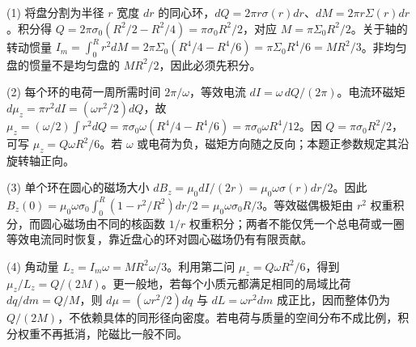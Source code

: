 (1) 将盘分割为半径 \(r\) 宽度 \(dr\) 的同心环，\(dQ=2\pi r\sigma(r)dr\)、\(dM=2\pi r\Sigma(r)dr\)。积分得 \(Q=2\pi\sigma_0(R^2/2-R^2/4)=\pi\sigma_0R^2/2\)，对应 \(M=\pi\Sigma_0R^2/2\)。关于轴的转动惯量 \(I_m=\int_0^Rr^2dM=2\pi\Sigma_0(R^4/4-R^4/6)=\pi\Sigma_0R^4/6=MR^2/3\)。非均匀盘的惯量不是均匀盘的 \(MR^2/2\)，因此必须先积分。

(2) 每个环的电荷一周所需时间 \(2\pi/\omega\)，等效电流 \(dI=\omega\,dQ/(2\pi)\)。电流环磁矩 \(d\mu_z=\pi r^2dI=(\omega r^2/2)dQ\)，故 \(\mu_z=(\omega/2)\int r^2dQ=\pi\sigma_0\omega(R^4/4-R^4/6)=\pi\sigma_0\omega R^4/12\)。因 \(Q=\pi\sigma_0R^2/2\)，可写 \(\mu_z=Q\omega R^2/6\)。若 \(\omega\) 或电荷为负，磁矩方向随之反向；本题正参数规定其沿旋转轴正向。

(3) 单个环在圆心的磁场大小 \(dB_z=\mu_0dI/(2r)=\mu_0\omega\sigma(r)dr/2\)。因此 \(B_z(0)=\mu_0\omega\sigma_0\int_0^R(1-r^2/R^2)dr/2=\mu_0\omega\sigma_0R/3\)。等效磁偶极矩由 \(r^2\) 权重积分，而圆心磁场由不同的核函数 \(1/r\) 权重积分；两者不能仅凭一个总电荷或一圈等效电流同时恢复，靠近盘心的环对圆心磁场仍有有限贡献。

(4) 角动量 \(L_z=I_m\omega=MR^2\omega/3\)。利用第二问 \(\mu_z=Q\omega R^2/6\)，得到 \(\mu_z/L_z=Q/(2M)\)。更一般地，若每个小质元都满足相同的局域比荷 \(dq/dm=Q/M\)，则 \(d\mu=(\omega r^2/2)dq\) 与 \(dL=\omega r^2dm\) 成正比，因而整体仍为 \(Q/(2M)\)，不依赖具体的同形径向密度。若电荷与质量的空间分布不成比例，积分权重不再抵消，陀磁比一般不同。
